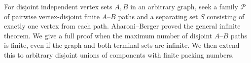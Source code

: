 For disjoint independent vertex sets $A,B$ in an arbitrary graph, seek a family $\mathcal P$ of pairwise vertex-disjoint finite $A$--$B$ paths and a separating set $S$ consisting of exactly one vertex from each path. Aharoni--Berger proved the general infinite theorem. We give a full proof when the maximum number of disjoint $A$--$B$ paths is finite, even if the graph and both terminal sets are infinite. We then extend this to arbitrary disjoint unions of components with finite packing numbers.
